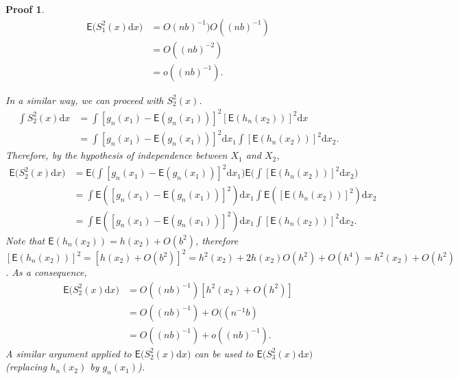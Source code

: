 \documentclass{article}
\newtheorem{Proof}{Proof}[section]
\begin{document}
\begin{Proof}
    \begin{align}
        \mathsf{E} \Bigg( S_1^2(x) \mathrm{d}x \Bigg) &= O(nb)^{-1})O((nb)^{-1}) \\
        &= O((nb)^{-2}) \\
        &= o((nb)^{-1}) .
    \end{align}

    In a similar way, we can proceed with $S^2_2(x)$.
    \begin{align}
        \int S_2^2(x) \mathrm{d}x &= \int [g_n(x_1) - \mathsf{E} (g_n(x_1))]^2 [\mathsf{E} (h_n(x_2))]^2 \mathrm{d}x \\
        &= \int [g_n(x_1) - \mathsf{E} (g_n(x_1))]^2 \mathrm{d}x_1 \int [\mathsf{E} (h_n(x_2))]^2 \mathrm{d}x_2.
    \end{align}
    Therefore, by the hypothesis of independence between $X_1$ and $X_2$,
    \begin{align}
        \mathsf{E} \Bigg( S_2^2(x) \mathrm{d}x \Bigg) &= \mathsf{E} \Bigg( \int [g_n(x_1) - \mathsf{E} (g_n(x_1))]^2 \mathrm{d}x_1 \Bigg) \mathsf{E} \Bigg( \int [\mathsf{E} (h_n(x_2))]^2 \mathrm{d}x_2 \Bigg) \\
        &= \int \mathsf{E} ( [g_n(x_1) - \mathsf{E} (g_n(x_1))]^2 ) \mathrm{d}x_1 \int  \mathsf{E} ( [\mathsf{E} (h_n(x_2))]^2 ) \mathrm{d}x_2 \\
        &= \int \mathsf{E} ( [g_n(x_1) - \mathsf{E} (g_n(x_1))]^2 ) \mathrm{d}x_1 \int [\mathsf{E} (h_n(x_2))]^2  \mathrm{d}x_2.
    \end{align}
    Note that $\mathsf{E} (h_n(x_2)) = h(x_2) + O(b^2)$, therefore $[\mathsf{E} (h_n(x_2))]^2 = [h(x_2) + O(b^2)]^2 = h^2(x_2) + 2 h(x_2) O(h^2) + O(h^4) = h^2(x_2) + O(h^2)$. As a consequence,
    \begin{align}
        \mathsf{E} \Bigg( S_2^2(x) \mathrm{d}x \Bigg) &= O((nb)^{-1}) [h^2(x_2) + O(h^2)] \\
        &= O((nb)^{-1}) + O((n^{-1}b) \\
        &= O((nb)^{-1}) + o((nb)^{-1}).
    \end{align}
    A similar argument applied to $\mathsf{E} \Bigg( S_2^2(x) \mathrm{d}x \Bigg)$ can be used to $\mathsf{E} \Bigg( S_3^2(x) \mathrm{d}x \Bigg)$ (replacing $h_n(x_2)$ by $g_n(x_1)$).
    

\end{Proof}
\end{document}
